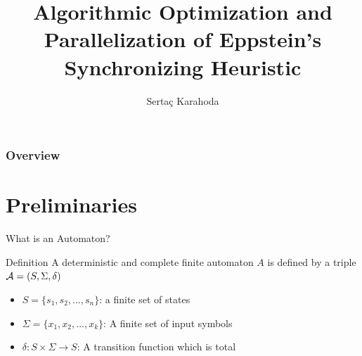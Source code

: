 \documentclass{beamer}
\title{Algorithmic Optimization and Parallelization
of Eppstein's Synchronizing Heuristic}
\author[S. Karahoda]{Serta\c{c} Karahoda}
\institute[Sabanc\i{} Univ.] %
{Computer Science and Engineering, Faculty of Science and Engineering, Sabanc\i{} University, Tuzla, \.{I}stanbul, Turkey
}
\date{\DayAfter[1]} %
\begin{document}
\begin{frame}
\titlepage %
\end{frame}

\begin{frame}
\frametitle{Overview} %
\tableofcontents 
\end{frame}


\section{Preliminaries}

\begin{frame}{What is an Automaton?}

	\begin{block}{Definition}
		A \alert{deterministic and complete finite automaton $A$} is defined by a triple ${\cal A}=(S,\Sigma,\delta)$
		\begin{itemize}
			\item $S = \{ s_1, s_2, \ldots, s_n \}$: a finite set of states 
			\item $\Sigma = \{ x_1, x_2, \ldots, x_k \}$: A finite set of input symbols 
			\item $\delta : S \times \Sigma \rightarrow S$: A transition function which is \alert{total}
		\end{itemize}
	\end{block}
\end{frame}
\end{document}
